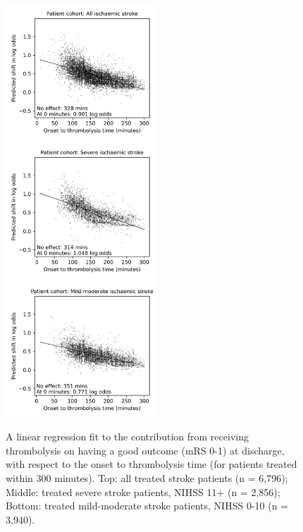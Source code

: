 \begin{figure}[!ht]
    \centering
    \includegraphics[width=0.50\textwidth]{./images/103_xgb_7_features_1fold_binary_improvement_logodds_mrs0_1_sns_subplots_ivt_shap_paper}\\
    \caption{A linear regression fit to the contribution from receiving thrombolysis on having a good outcome (mRS 0-1) at discharge, with respect to the onset to thrombolysis time (for patients treated within 300 minutes). Top: all treated stroke patients (n = 6,796); Middle: treated severe stroke patients, NIHSS 11+ (n = 2,856); Bottom: treated mild-moderate stroke patients, NIHSS 0-10 (n = 3,940).}
    \label{fig:linear_regression_plots}
\end{figure}


